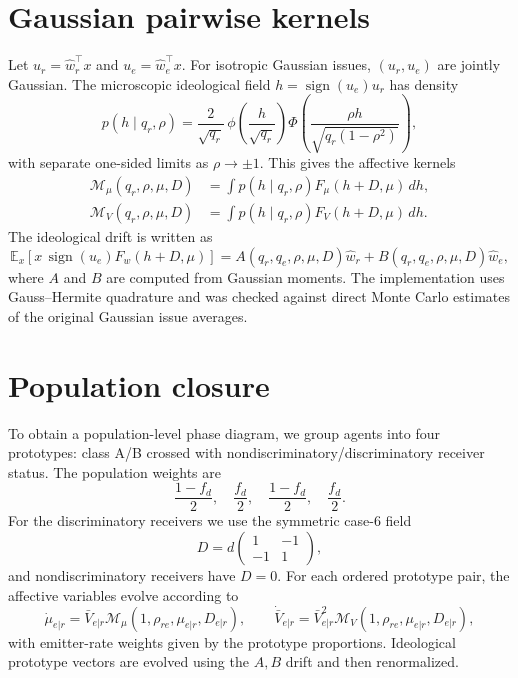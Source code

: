 \documentclass{article}
\newcommand{\PhiN}{\Phi}
\newcommand{\phin}{\phi}
\newcommand{\Fw}{F_w}
\newcommand{\Fmu}{F_\mu}
\newcommand{\FV}{F_V}
\newcommand{\Mm}{\mathcal{M}_\mu}
\newcommand{\MV}{\mathcal{M}_V}
\begin{document}
\section{Gaussian pairwise kernels}

Let \(u_r=\hat w_r^\top x\) and \(u_e=\hat w_e^\top x\).  For isotropic Gaussian
issues, \((u_r,u_e)\) are jointly Gaussian.  The microscopic ideological field
\(h=\operatorname{sign}(u_e)u_r\) has density
\begin{equation}
  p(h\mid q_r,\rho)
  =
  \frac{2}{\sqrt{q_r}}\,
  \phin\!\left(\frac{h}{\sqrt{q_r}}\right)
  \PhiN\!\left(
  \frac{\rho h}{\sqrt{q_r(1-\rho^2)}}
  \right),
\end{equation}
with separate one-sided limits as \(\rho\to\pm1\).  This gives the affective
kernels
\begin{align}
  \Mm(q_r,\rho,\mu,D)
  &= \int p(h\mid q_r,\rho)\Fmu(h+D,\mu)\,dh,\\
  \MV(q_r,\rho,\mu,D)
  &= \int p(h\mid q_r,\rho)\FV(h+D,\mu)\,dh.
\end{align}
The ideological drift is written as
\begin{equation}
  \mathbb{E}_x[x\,\operatorname{sign}(u_e)\Fw(h+D,\mu)]
  =
  A(q_r,q_e,\rho,\mu,D)\hat w_r
  +
  B(q_r,q_e,\rho,\mu,D)\hat w_e,
\end{equation}
where \(A\) and \(B\) are computed from Gaussian moments.  The implementation
uses Gauss--Hermite quadrature and was checked against direct Monte Carlo
estimates of the original Gaussian issue averages.

\section{Population closure}

To obtain a population-level phase diagram, we group agents into four
prototypes: class A/B crossed with nondiscriminatory/discriminatory receiver
status.  The population weights are
\[
  \frac{1-f_d}{2},\quad \frac{f_d}{2},\quad
  \frac{1-f_d}{2},\quad \frac{f_d}{2}.
\]
For the discriminatory receivers we use the symmetric case-6 field
\[
  D =
  d
  \begin{pmatrix}
  1 & -1\\
  -1 & 1
  \end{pmatrix},
\]
and nondiscriminatory receivers have \(D=0\).  For each ordered prototype pair,
the affective variables evolve according to
\[
  \dot\mu_{e|r}=\bar V_{e|r}\Mm(1,\rho_{re},\mu_{e|r},D_{e|r}),
  \qquad
  \dot{\bar V}_{e|r}=\bar V_{e|r}^{2}\MV(1,\rho_{re},\mu_{e|r},D_{e|r}),
\]
with emitter-rate weights given by the prototype proportions.  Ideological
prototype vectors are evolved using the \(A,B\) drift and then renormalized.
\end{document}
